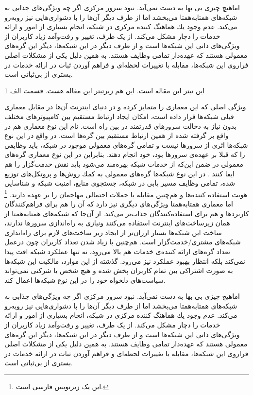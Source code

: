 \documentclass[12pt,twoside]{xepersian-magazine}
\begin{document}
\begin{article}{2}
اماهيچ چيزی بی‌ بها به دست نمی‌آید. نبود سرور مرکزی اگر چه  ويژگی‌های جذابی به شبکه‌های همتابه‌همتا می‌بخشد اما از طرف ديگر آن‌ها را با دشواری‌هايی نيز روبه‌رو می‌کند.  عدم وجود يك هماهنگ كننده مركزی در شبكه، انجام بسياری از امور و ارائه خدمات را  دچار مشكل می‌کند.  از يک طرف، تغيير و رفت‌وآمد زیاد کاربران از ويژگی‌های ذاتی اين شبکه‌ها است و از طرف ديگر در اين شبكه‌ها، ديگر اين گره‌های معمولی  هستند كه  عهده‌دار تمامی وظايف هستند. به همين دلیل يکی از مشکلات اصلی فراروی اين شبكه‌ها، مقابله با  تغييرات لحظه‌ای و فراهم آوردن ثبات در ارائه  خدمات در بستری از بی‌ثباتی است.
\end{article}

\articlesep

\begin{article}{2}
	{این تیتر این مقاله است.}
	{این هم زیرتیتر این مقاله هست.}
	{قسمت الف}
	{1}

\noindent{}
ويژگی اصلی که اين معماری را متمايز کرده و در دنيای اينترنت آن‌ها در مقابل معماری قبلی شبكه‌ها قرار داده است، امكان ايجاد ارتباط مستقيم  بين كامپيوترهای مختلف بدون نياز به دخالت سرورهای قدرتمند در بين راه است.  نام‌ اين نوع معماری هم در واقع بر گرفته شده از همین  ارتباط مستقیم بين گره‌ها است.  در واقع در اين نوع شبكه‌ها اثری از سرورها نيست و تمامی گره‌های معمولی موجود در شبكه، بايد وظايفی را که قبلا بر عهده‌ی سرورها بود، خود انجام دهند. بنابراين در اين نوع معماری گره‌های معمولی در ضمن اين‌که از خدمات شبکه بهره‌مند می‌شود بايد نقش خدمت‌گزار را هم ايفا کنند . در اين نوع شبکه‌ها گره‌های معمولی به كمك روش‌ها و پروتكل‌های توزيع شده، تمامی وظايف  مسير يابی در شبكه، جستجوی منابع، امنيت شبكه و شناسايی هويت استفاده كننده‌ها و هم‌چنين مقابله با حملات احتمالی مهاجمان را بر عهده دارند.
\footnote{این یک زیرنویس فارسی است.}
اما معماری همتابه‌همتا ويژگی‌های ديگری نيز دارد که آن را هم برای فراهم‌کنندگان کاربردها و هم برای استفاده‌کنندگان جذاب‌تر می‌کند.  از آن‌جا که شبکه‌های همتابه‌همتا از همان زيرساخت‌های اينترنت استفاده می‌کنند ونيازی به راه‌اندازی سرورها ندارند، ساخت اين شبكه‌ها بسيار ارزان‌تر از ايجاد زير ساخت‌های لازم برای راه‌اندازی شبكه‌های مشتری/خدمت‌گزار است.  هم‌چنين با زياد شدن تعداد کاربران چون درعمل تعداد گره‌های ارائه کننده‌ی خدمات هم بالا می‌رود، نه تنها عملكرد شبكه افت پيدا نمی‌كند بلكه انتظار بهبود عملکرد نيز می‌رود. گذشته از اين موارد، مالكيت اين شبكه‌ها به صورت اشتراكی بين تمام کاربران پخش شده و هيچ شخص يا شركتی نمی‌تواند سياست‌های دلخواه خود را در اين نوع شبكه‌ها اعمال کند.

اماهيچ چيزی بی‌ بها به دست نمی‌آید. نبود سرور مرکزی اگر چه  ويژگی‌های جذابی به شبکه‌های همتابه‌همتا می‌بخشد اما از طرف ديگر آن‌ها را با دشواری‌هايی نيز روبه‌رو می‌کند.  عدم وجود يك هماهنگ كننده مركزی در شبكه، انجام بسياری از امور و ارائه خدمات را  دچار مشكل می‌کند.  از يک طرف، تغيير و رفت‌وآمد زیاد کاربران از ويژگی‌های ذاتی اين شبکه‌ها است و از طرف ديگر در اين شبكه‌ها، ديگر اين گره‌های معمولی  هستند كه  عهده‌دار تمامی وظايف هستند. به همين دلیل يکی از مشکلات اصلی فراروی اين شبكه‌ها، مقابله با  تغييرات لحظه‌ای و فراهم آوردن ثبات در ارائه  خدمات در بستری از بی‌ثباتی است.  


\end{article}
\end{document}
